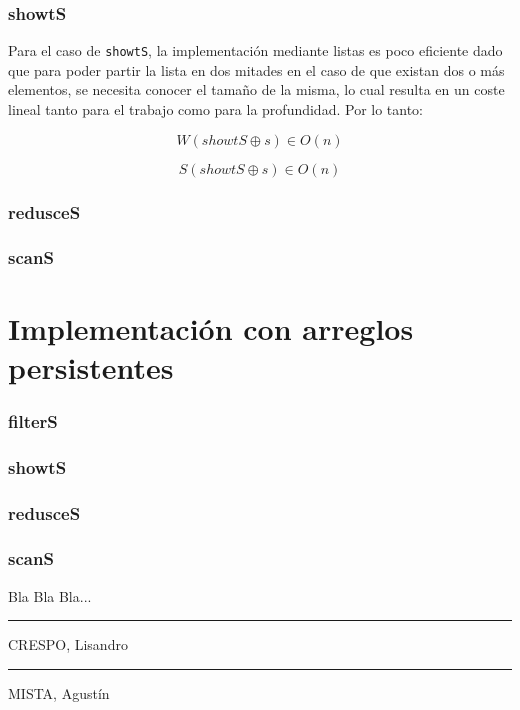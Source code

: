 \documentclass[a4paper,10pt]{article}
\begin{document}
	\section*{\Large showtS}
		Para el caso de \texttt{showtS}, la implementación mediante listas es poco eficiente dado que para poder partir la lista
		en dos mitades en el caso de que existan dos o más elementos, se necesita conocer el tamaño de la misma, lo cual resulta en un
		coste lineal tanto para el trabajo como para la profundidad. Por lo tanto:
	
		\begin{equation*}
			W\left( showtS \oplus s \right) \in O\left( n \right)
		\end{equation*}		
		
		\begin{equation*}
			S\left( showtS \oplus s \right) \in O\left( n \right)
		\end{equation*}	
	
	\section*{\Large redusceS}
	
	
	
	\section*{\Large scanS}
	
	
	
	
	
\pagebreak	
\part*{Implementación con arreglos persistentes}

	\section*{\Large filterS}
	
	
	
	\section*{\Large showtS}
	
	
	
	\section*{\Large redusceS}
	
	
	
	\section*{\Large scanS}


\pagebreak

Bla Bla Bla...

\vspace{\fill}
\begin{multicols}{2}
	\hrule
	\vspace{5pt}
	CRESPO, Lisandro \\
	\linebreak

	\hrule
	\vspace{5pt}
	MISTA, Agustín \\
\end{multicols}
\end{document}
